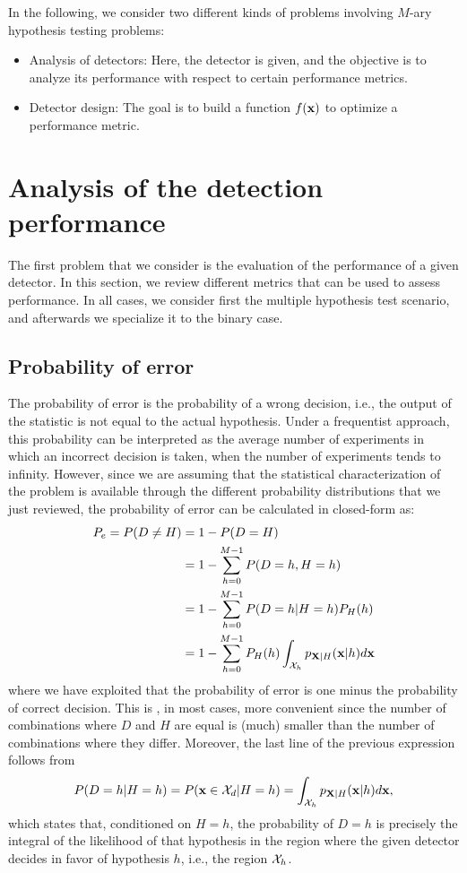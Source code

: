 In the following, we consider two different kinds of problems involving $M$-ary hypothesis testing problems:
\begin{itemize}
	\item Analysis of detectors: Here, the detector is given, and the objective is to analyze its performance with respect to certain performance metrics.
	\item Detector design: The goal is to build a function $f(\bf x)$ to optimize a performance metric.
\end{itemize}

\section{Analysis of the detection performance}
\label{subsec:analysis}

The first problem that we consider is the evaluation of the performance of a given detector. In this section, we review different metrics that can be used to assess performance. In all cases, we consider first the multiple hypothesis test scenario, and afterwards we specialize it to the binary case.

\subsection{Probability of error}

The probability of error is the probability of a wrong decision, i.e., the output of the statistic is not equal to the actual hypothesis. Under a frequentist approach, this probability can be interpreted as the average number of experiments in which an incorrect decision is taken, when the number of experiments tends to infinity. However, since we are assuming that the statistical characterization of the problem is available through the different probability distributions that we just reviewed, the probability of error can be calculated in closed-form as:
\begin{align}
    P_e = P(D\neq H) & = 1 - P(D=H) \nonumber \\
    & = 1 - \sum_{h=0}^{M-1} P(D=h, H=h) \nonumber \\
    & = 1 - \sum_{h=0}^{M-1} P(D=h| H=h) P_H(h) \nonumber \\
    & = 1 - \sum_{h=0}^{M-1} P_H(h) \int_{{\cal X}_h} p_{{\bf X}|H}({\bf x}|h) d{\bf x}\nonumber
\end{align}
where we have exploited that the probability of error is one minus the probability of correct decision. This is , in most cases, more convenient since the number of combinations where $D$ and $H$ are equal is (much) smaller than the number of combinations where they differ. Moreover, the last line of the previous expression follows from
$$P(D=h| H=h) = P({\bf x}\in {\cal X}_d| H=h) = \int_{{\cal X}_h} p_{{\bf X}|H}({\bf x}|h) d{\bf x},$$
which states that, conditioned on $H=h$, the probability of $D=h$ is precisely the integral of the likelihood of that hypothesis in the region where the given detector decides in favor of hypothesis $h$, i.e., the region ${\cal X}_h$.

